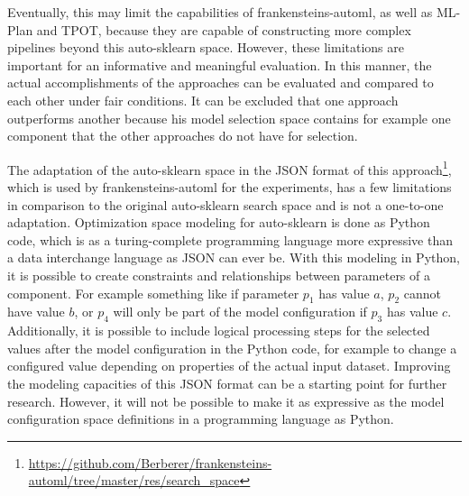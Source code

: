 Eventually, this may limit the capabilities of frankensteins-automl, as well as ML-Plan and TPOT, because they are capable of constructing more complex pipelines beyond this auto-sklearn space.
However, these limitations are important for an informative and meaningful evaluation.\newline
In this manner, the actual accomplishments of the approaches can be evaluated and compared to each other under fair conditions.
It can be excluded that one approach outperforms another because his model selection space contains for example one component that the other approaches do not have for selection.

The adaptation of the auto-sklearn space in the JSON format of this approach\footnote{\url{https://github.com/Berberer/frankensteins-automl/tree/master/res/search_space}}, which is used by frankensteins-automl for the experiments, has a few limitations in comparison to the original auto-sklearn search space and is not a one-to-one adaptation.
Optimization space modeling for auto-sklearn is done as Python code, which is as a turing-complete programming language more expressive than a data interchange language as JSON can ever be.
With this modeling in Python, it is possible to create constraints and relationships between parameters of a component.
For example something like if parameter $p_1$ has value $a$, $p_2$ cannot have value $b$, or $p_4$ will only be part of the model configuration if $p_3$ has value $c$.\newline
Additionally, it is possible to include logical processing steps for the selected values after the model configuration in the Python code, for example to change a configured value depending on properties of the actual input dataset.\newline
Improving the modeling capacities of this JSON format can be a starting point for further research.
However, it will not be possible to make it as expressive as the model configuration space definitions in a programming language as Python.

